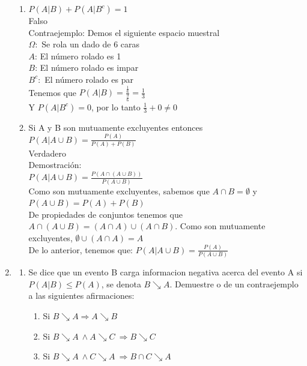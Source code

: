 \documentclass[12pt,a4paper]{report}
\begin{document}
\begin{enumerate}
{\begin{enumerate}[label=\alph*) ]
	\item{$P(A|B) + P(A|B^c)=1$}\\
	
	Falso\\
	
	Contraejemplo: Demos el siguiente espacio muestral\\
	$\Omega:$ Se rola un dado de 6 caras\\
	$A$: El número rolado es 1\\
	$B$: El número rolado es impar\\
	$B^c:$ El número rolado es par\\
	
	Tenemos que $P(A|B)= \frac{\frac{1}{6}}{\frac{3}{6}} = \frac{1}{3}$\\
	Y $P(A|B^c) = 0$, por lo tanto $\frac{1}{3} + 0 \neq 0$\\
	
	
	\item{Si A y B son mutuamente excluyentes entonces $P(A|A \cup B)=\frac{P(A)}{P(A)+P(B)}$}\\

	Verdadero\\
	
	Demostración:\\
	 $P(A|A \cup B) = \frac{P (A \cap (A \cup B))}{P(A \cup B)}$\\
	Como son mutuamente excluyentes, sabemos que $A \cap B = \emptyset$ y $P(A \cup B) = P(A) + P(B)$\\
	De propiedades de conjuntos tenemos que $A \cap (A \cup B) = (A \cap A) \cup (A \cap B)$. Como son mutuamente excluyentes, $\emptyset \cup (A \cap A) = A$\\
	De lo anterior, tenemos que:
	$P(A|A \cup B) = \frac{P(A)}{P(A \cup B)}$\\
	


\end{enumerate}

	}


   \item {
   
	\begin{enumerate}[label=\alph*) ]
   \item {
	Se dice que un evento B carga informacion negativa acerca del evento A si $P(A|B) \leq P(A)$, se denota  $B \searrow A$. Demuestre o de un contraejemplo a las siguientes afirmaciones:
		\begin{enumerate}
		\item{Si $B \searrow A \Rightarrow A \searrow B$}\\
			\item{Si $B \searrow A \ \wedge A \searrow C \ \Rightarrow B \searrow C$}\\
		\item{Si $B \searrow A \ \wedge C \searrow A \ \Rightarrow B\cap C \searrow A$}
		\end{enumerate}


}
\end{enumerate}}
\end{enumerate}
\end{document}

